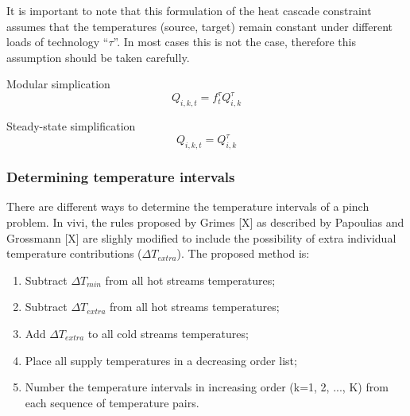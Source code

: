 \documentclass[10pt,twoside,a4paper]{report}
\begin{document}
It is important to note that this formulation of the heat cascade
constraint assumes that the temperatures (source, target) remain
constant under different loads of technology ``$\tau$''. In most cases
this is not the case, therefore this assumption should be taken
carefully.

Modular simplication
\begin{equation}
  Q_{i,k,t} = f^\tau_t Q_{i,k}^\tau
\end{equation}

Steady-state simplification
\begin{equation}
  Q_{i,k,t} = Q_{i,k}^\tau
\end{equation}




\subsubsection{Determining temperature intervals}

There are different ways to determine the temperature intervals of a
pinch problem. In vivi, the rules proposed by Grimes [X] as described
by Papoulias and Grossmann [X] are slighly modified to include the
possibility of extra individual temperature contributions
($\Delta T_{extra}$). The proposed method is:

\begin{enumerate}
\item Subtract $\Delta T_{min}$ from all hot streams temperatures;
\item Subtract $\Delta T_{extra}$ from all hot streams temperatures;
\item Add $\Delta T_{extra} $ to all cold streams temperatures;
\item Place all supply temperatures in a decreasing order list;
\item Number the temperature intervals in increasing order
  (k=1, 2, ..., K) from each sequence of temperature pairs.
\end{enumerate}
\end{document}
